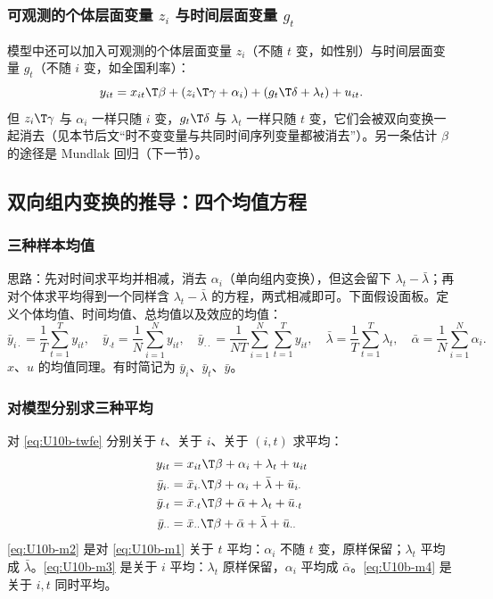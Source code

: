 \subsubsection{可观测的个体层面变量 \texorpdfstring{$z_i$}{z\_i} 与时间层面变量 \texorpdfstring{$g_t$}{g\_t}}

模型中还可以加入可观测的个体层面变量 $z_i$（不随 $t$ 变，如性别）与时间层面变量 $g_t$（不随 $i$ 变，如全国利率）：
\[
y_{it}=x_{it}\T\beta+(z_i\T\gamma+\alpha_i)+(g_t\T\delta+\lambda_t)+u_{it}.
\]
但 $z_i\T\gamma$ 与 $\alpha_i$ 一样只随 $i$ 变，$g_t\T\delta$ 与 $\lambda_t$ 一样只随 $t$ 变，它们会被双向变换一起消去（见本节后文“时不变变量与共同时间序列变量都被消去”）。另一条估计 $\beta$ 的途径是 Mundlak 回归（下一节）。

\subsection{双向组内变换的推导：四个均值方程}

\subsubsection{三种样本均值}

思路：先对时间求平均并相减，消去 $\alpha_i$（单向组内变换），但这会留下 $\lambda_t-\bar\lambda$；再对个体求平均得到一个同样含 $\lambda_t-\bar\lambda$ 的方程，两式相减即可。下面假设面板。定义个体均值、时间均值、总均值以及效应的均值：
\[
\bar y_{i\cdot}=\frac1T\sum_{t=1}^T y_{it},\quad
\bar y_{\cdot t}=\frac1N\sum_{i=1}^N y_{it},\quad
\bar y_{\cdot\cdot}=\frac1{NT}\sum_{i=1}^N\sum_{t=1}^T y_{it},\quad
\bar\lambda=\frac1T\sum_{t=1}^T\lambda_t,\quad
\bar\alpha=\frac1N\sum_{i=1}^N\alpha_i.
\]
$x$、$u$ 的均值同理。有时简记为 $\bar y_i$、$\bar y_t$、$\bar y$。

\subsubsection{对模型分别求三种平均}

对 \eqref{eq:U10b-twfe} 分别关于 $t$、关于 $i$、关于 $(i,t)$ 求平均：
\begin{align}
y_{it} &= x_{it}\T\beta+\alpha_i+\lambda_t+u_{it} \label{eq:U10b-m1}\\
\bar y_{i\cdot} &= \bar x_{i\cdot}\T\beta+\alpha_i+\bar\lambda+\bar u_{i\cdot} \label{eq:U10b-m2}\\
\bar y_{\cdot t} &= \bar x_{\cdot t}\T\beta+\bar\alpha+\lambda_t+\bar u_{\cdot t} \label{eq:U10b-m3}\\
\bar y_{\cdot\cdot} &= \bar x_{\cdot\cdot}\T\beta+\bar\alpha+\bar\lambda+\bar u_{\cdot\cdot} \label{eq:U10b-m4}
\end{align}
\eqref{eq:U10b-m2} 是对 \eqref{eq:U10b-m1} 关于 $t$ 平均：$\alpha_i$ 不随 $t$ 变，原样保留；$\lambda_t$ 平均成 $\bar\lambda$。\eqref{eq:U10b-m3} 是关于 $i$ 平均：$\lambda_t$ 原样保留，$\alpha_i$ 平均成 $\bar\alpha$。\eqref{eq:U10b-m4} 是关于 $i,t$ 同时平均。


